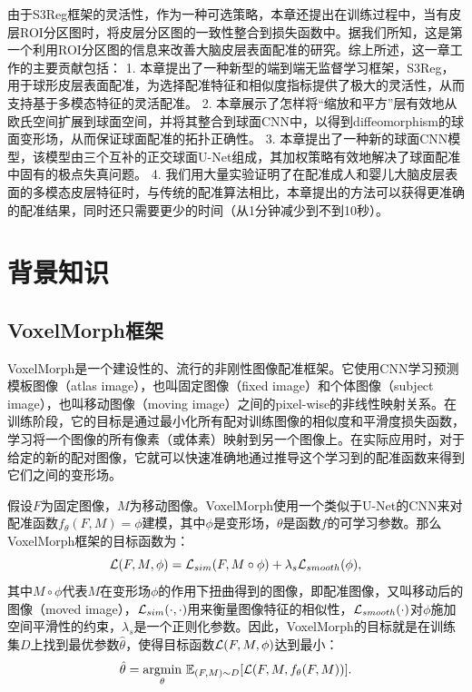 由于S3Reg框架的灵活性，作为一种可选策略，本章还提出在训练过程中，当有皮层ROI分区图时，将皮层分区图的一致性整合到损失函数中。据我们所知，这是第一个利用ROI分区图的信息来改善大脑皮层表面配准的研究。综上所述，这一章工作的主要贡献包括：
1. 本章提出了一种新型的端到端无监督学习框架，S3Reg，用于球形皮层表面配准，为选择配准特征和相似度指标提供了极大的灵活性，从而支持基于多模态特征的灵活配准。
2. 本章展示了怎样将“缩放和平方”层有效地从欧氏空间扩展到球面空间，并将其整合到球面CNN中，以得到diffeomorphism的球面变形场，从而保证球面配准的拓扑正确性。
3. 本章提出了一种新的球面CNN模型，该模型由三个互补的正交球面U-Net组成，其加权策略有效地解决了球面配准中固有的极点失真问题。
4. 我们用大量实验证明了在配准成人和婴儿大脑皮层表面的多模态皮层特征时，与传统的配准算法相比，本章提出的方法可以获得更准确的配准结果，同时还只需要更少的时间（从1分钟减少到不到10秒）。

\section{背景知识}
\subsection{VoxelMorph框架}
VoxelMorph\cite{balakrishnan2018unsupervised}是一个建设性的、流行的非刚性图像配准框架。它使用CNN学习预测模板图像（atlas image），也叫固定图像（fixed image）和个体图像（subject image），也叫移动图像（moving image）之间的pixel-wise的非线性映射关系。在训练阶段，它的目标是通过最小化所有配对训练图像的相似度和平滑度损失函数，学习将一个图像的所有像素（或体素）映射到另一个图像上。在实际应用时，对于给定的新的配对图像，它就可以快速准确地通过推导这个学习到的配准函数来得到它们之间的变形场。

假设$F$为固定图像，$M$为移动图像。VoxelMorph使用一个类似于U-Net的CNN来对配准函数$f_{\theta}(F,M)=\phi$建模，其中$\phi$是变形场，$\theta$是函数$f$的可学习参数。那么VoxelMorph框架的目标函数为：
\begin{equation}\label{eq:3-1}
{\cal L}(F,M,\phi)={\cal L}_{sim}(F,M\circ{\phi})+\lambda_s{{\cal L}_{smooth}(\phi)},
\end{equation}
其中$M\circ\phi$代表$M$在变形场$\phi$的作用下扭曲得到的图像，即配准图像，又叫移动后的图像（moved image），${\cal L}_{sim}(\cdot,\cdot)$用来衡量图像特征的相似性，${\cal L}_{smooth}(\cdot)$对$\phi$施加空间平滑性的约束，$\lambda_s$是一个正则化参数。因此，VoxelMorph的目标就是在训练集$D$上找到最优参数$\hat{\theta}$，使得目标函数${\cal L}(F,M,\phi)$达到最小：
\begin{equation}
\hat{\theta}=\underset{\theta}{\mathrm{argmin}}~\mathbb{E}_{(F,M)\sim D}[{\cal L}(F,M,f_{\theta}(F,M))].
\end{equation}

